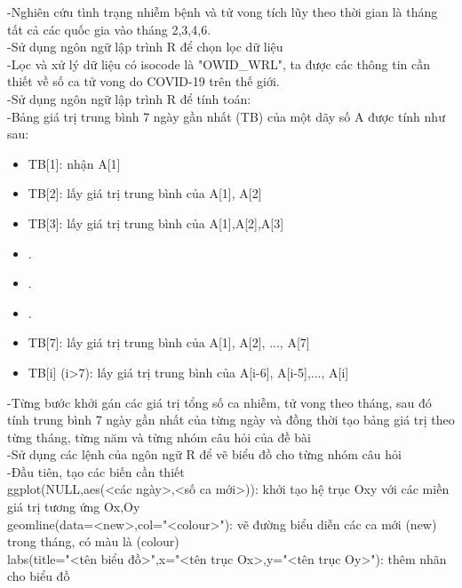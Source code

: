\documentclass[a4paper]{article}
\theoremstyle{definition}
\begin{document}
\begin{enumerate}[i)]
        -Nghiên cứu tình trạng nhiễm bệnh và tử vong tích lũy theo thời gian là tháng tất cả các quốc gia vào tháng 2,3,4,6.\\

        -Sử dụng ngôn ngữ lập trình R để chọn lọc dữ liệu\\

        -Lọc và xử lý dữ liệu có isocode là "OWID\_WRL", ta được các thông tin cần thiết về số ca tử vong do COVID-19 trên thế giới.\\

        -Sử dụng ngôn ngữ lập trình R để tính toán:\\

        -Bảng giá trị trung bình 7 ngày gần nhất (TB) của một dãy số A được tính như sau:\\
        \begin{itemize}
            \item TB[1]: nhận A[1]\\
            \item TB[2]: lấy giá trị trung bình của A[1], A[2]\\
            \item TB[3]: lấy giá trị trung bình của A[1],A[2],A[3]\\
            \item .\\
            \item .\\
            \item .\\
            \item TB[7]: lấy giá trị trung bình của A[1], A[2], ..., A[7]\\
            \item TB[i] (i>7): lấy giá trị trung bình của A[i-6], A[i-5],..., A[i]\\
        \end{itemize}

        -Từng bước khởi gán các giá trị tổng số ca nhiễm, tử vong theo tháng, sau đó tính trung bình 7 ngày gần nhất của từng ngày và đồng thời tạo bảng giá trị theo từng tháng, từng năm và từng nhóm câu hỏi của đề bài\\

        -Sử dụng các lệnh của ngôn ngữ R để vẽ biểu đồ cho từng nhóm câu hỏi\\

        -Đầu tiên, tạo các biến cần thiết\\
        ggplot(NULL,aes(<các ngày>,<số ca mới>)): khởi tạo hệ trục Oxy với các miền giá trị tương ứng Ox,Oy\\
        geomline(data=<new>,col="<colour>"): vẽ đường biểu diễn các ca mới (new) trong tháng, có màu là (colour)\\
        labs(title="<tên biểu đồ>",x="<tên trục Ox>,y="<tên trục Oy>"): thêm nhãn cho biểu đồ\\
        

\end{enumerate}
\end{document}
